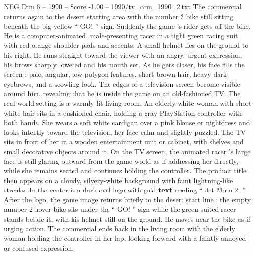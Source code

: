 \begin{textsample}{NEG Dim 6 – 1990 – Score -1.00 – 1990/tv\_com\_1990\_2.txt}
The commercial returns again to the desert starting area with the number 2 bike still sitting beneath the big yellow “ GO! ” sign.
Suddenly the game ’s rider gets off the bike.
He is a computer-animated, male-presenting racer in a tight green racing suit with red-orange shoulder pads and accents.
A small helmet lies on the ground to his right.
He runs straight toward the viewer with an angry, urgent expression, his brows sharply lowered and his mouth set.
As he gets closer, his face fills the screen : pale, angular, low-polygon features, short brown hair, heavy dark eyebrows, and a scowling look.
The edges of a television screen become visible around him, revealing that he is inside the game on an old-fashioned TV.
The real-world setting is a warmly lit living room.
An elderly white woman with short white hair sits in a cushioned chair, holding a gray PlayStation controller with both hands.
She wears a soft white cardigan over a pink blouse or nightdress and looks intently toward the television, her face calm and slightly puzzled.
The TV sits in front of her in a wooden entertainment unit or cabinet, with shelves and small decorative objects around it.
On the TV screen, the animated racer ’s large face is still glaring outward from the game world as if addressing her directly, while she remains seated and continues holding the controller.
The product title then appears on a cloudy, silvery-white background with faint lightning-like streaks.
In the center is a dark oval logo with gold \textbf{text} reading “ Jet Moto 2. ” After the logo, the game image returns briefly to the desert start line : the empty number 2 hover bike sits under the “ GO! ” sign while the green-suited racer stands beside it, with his helmet still on the ground.
He moves near the bike as if urging action.
The commercial ends back in the living room with the elderly woman holding the controller in her lap, looking forward with a faintly annoyed or confused expression.

\end{textsample}

